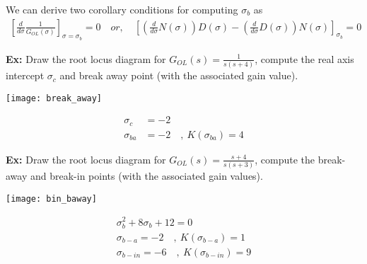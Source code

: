 \documentclass[twoside]{article}
\begin{document}
\begin{enumerate}
We can derive two corollary conditions for computing $\sigma_b$ as
%
%
\begin{align*}
\left[ \frac{d}{d \sigma} \frac{1}{G_{OL}(\sigma)} \right]_{\sigma = \sigma_b} = 0
\quad or , \quad
\left[ \left( \frac{d}{d \sigma} N(\sigma) \right) D(\sigma)  -
\left( \frac{d}{d \sigma} D(\sigma) \right)  N(\sigma) \right]_{\sigma_b} = 0
\end{align*}

\newpage

\textbf{Ex:} Draw the root locus diagram for $G_{OL}(s) = \frac{1}{s (s+4)}$,
compute the real axis intercept $\sigma_c$ and break away point (with the associated gain value).

\begin{minipage}[h]{0.5\linewidth}
    \begin{center}
      \texttt{[image: break\_away]}
    \end{center}
\end{minipage}
\begin{minipage}[h]{0.5\linewidth}
	\begin{align*}
	\sigma_c &=  -2
	\\
	\sigma_{ba} &=  -2 \quad , \ K(\sigma_{ba}) = 4
	\end{align*}
\end{minipage}

\vspace{12pt}

\textbf{Ex:} Draw the root locus diagram for $G_{OL}(s) = \frac{s+4}{s (s+3)}$,
compute the break-away and break-in points (with the associated gain values).

\begin{minipage}[h]{0.5\linewidth}
    \begin{center}
      \texttt{[image: bin\_baway]}
    \end{center}
\end{minipage}
\begin{minipage}[h]{0.5\linewidth}
	\begin{align*}
	\sigma_{b}^2 + 8 \sigma_b + 12 = 0 
	\\
	\sigma_{b-a} =  -2 \quad , \ K(\sigma_{b-a}) = 1
	\\
	\sigma_{b-in} =  -6 \quad , \ K(\sigma_{b-in}) = 9
	\end{align*}
\end{minipage}

\vspace{12pt}


\end{enumerate}
\end{document}
